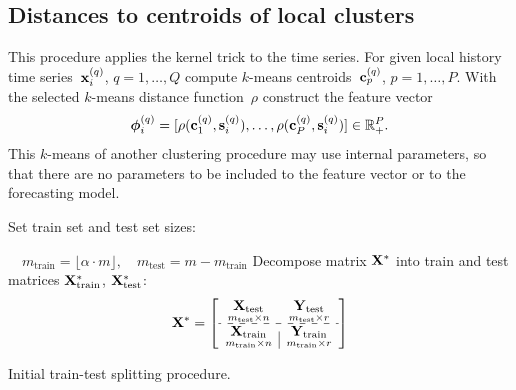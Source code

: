 \documentclass[conference]{IEEEtran}
\begin{document}
\subsection{Distances to centroids of local clusters}
This procedure applies the kernel trick to the time series. For given local history time series~${\mathbf{x}}_i^{(q)}$, $q=1,\dots, Q$ compute $k$-means centroids~${\mathbf{c}}_p^{(q)}$, $p = 1, \dots, P$.  With the selected $k$-means distance function~$\rho$ construct the feature vector
\[
{\boldsymbol{\phi}}_i^{(q)} = [\rho({\mathbf{c}}_1^{(q)},{\mathbf{s}}_i^{(q)}),\dots,\rho({\mathbf{c}}^{(q)}_P,{\mathbf{s}}_i^{(q)})] \in \mathbb{R}_+^P.
\]
This $k$-means of another clustering procedure may use internal parameters, so that there are no parameters to be included to the feature vector or to the forecasting model.

\begin{algorithm}[!h]
{}
 Set train set and test set sizes:

 $ \quad m_{\text{train}} = \lfloor\alpha\cdot m\rfloor, \quad m_{\text{test}} = m - m_{\text{train}} $ \; %
 Decompose matrix ${\mathbf{X}}^{*}$ into train and test matrices ${\mathbf{X}}^{*}_{\text{train}}$, ${\mathbf{X}}^{*}_{\text{test}}$:
 \[\bX^{*} = \left[\begin{array}{c|c}
 \underset{m_{\text{test}}{\times}n}{\bX_{\text{test}}} & \underset{m_{\text{test}}{\times}r}{\bY_{\text{test}}}  \\
 \hdashline
 \underset{m_{\text{train}}{\times}n}{\bX_{\text{train}}}  & \underset{m_{\text{train}}{\times}r}{\bY_{\text{train}}}
 \end{array}\right]
 \]
  \caption{Initial train-test splitting procedure.}\label{alg:train_test}
\end{algorithm}
\end{document}
